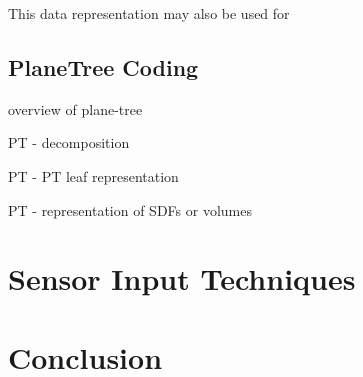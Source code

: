 This data representation may also be used for 

\subsection{PlaneTree Coding}

overview of plane-tree

PT - decomposition

PT - PT leaf representation

PT - representation of SDFs or volumes

\section{Sensor Input Techniques}



\section{Conclusion}